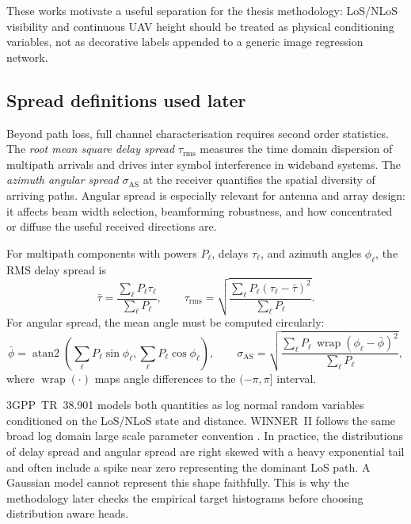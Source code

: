 These works motivate a useful separation for the thesis methodology: LoS/NLoS
visibility and continuous UAV height should be treated as physical conditioning
variables, not as decorative labels appended to a generic image regression
network.

\subsection{Spread definitions used later}

Beyond path loss, full channel characterisation requires second order statistics.
The \emph{root mean square delay spread} $\tau_{\mathrm{rms}}$ measures the
time domain dispersion of multipath arrivals and drives inter symbol interference
in wideband systems.  The \emph{azimuth angular spread} $\sigma_{\mathrm{AS}}$
at the receiver quantifies the spatial diversity of arriving paths.
Angular spread is especially relevant for antenna and array design: it affects
beam width selection, beamforming robustness, and how concentrated or diffuse
the useful received directions are.

For multipath components with powers \(P_\ell\), delays \(\tau_\ell\), and
azimuth angles \(\phi_\ell\), the RMS delay spread is
\begin{equation}
  \bar{\tau} =
  \frac{\sum_\ell P_\ell \tau_\ell}{\sum_\ell P_\ell},
  \qquad
  \tau_{\mathrm{rms}} =
  \sqrt{
  \frac{\sum_\ell P_\ell(\tau_\ell-\bar{\tau})^2}{\sum_\ell P_\ell}
  } .
\end{equation}
For angular spread, the mean angle must be computed circularly:
\begin{equation}
  \bar{\phi} =
  \operatorname{atan2}\!\left(
    \sum_\ell P_\ell \sin\phi_\ell,
    \sum_\ell P_\ell \cos\phi_\ell
  \right),
  \qquad
  \sigma_{\mathrm{AS}} =
  \sqrt{
  \frac{\sum_\ell P_\ell\,\operatorname{wrap}(\phi_\ell-\bar{\phi})^2}
       {\sum_\ell P_\ell}
  } ,
\end{equation}
where \(\operatorname{wrap}(\cdot)\) maps angle differences to the
\((-\pi,\pi]\) interval.

3GPP~TR~38.901 \cite{tr38901} models both quantities as log normal random
variables conditioned on the LoS/NLoS state and distance.  WINNER~II follows
the same broad log domain large scale parameter convention \cite{winner2}.
In practice, the distributions of delay spread and angular spread are
right skewed with a heavy exponential tail and often include a spike near zero
representing the dominant LoS path. A Gaussian model cannot represent this
shape faithfully. This is why the methodology later checks the empirical target
histograms before choosing distribution aware heads.

